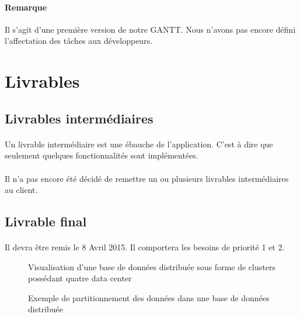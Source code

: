 \documentclass[12pt]{article}
\begin{document}
 \vspace{1cm}
 
\paragraph{Remarque} Il s'agit d'une première version de notre GANTT. Nous n'avons pas encore défini l'affectation des tâches aux développeurs.


\newpage

\section{Livrables}

\subsection{Livrables intermédiaires}

\paragraph{} Un livrable intermédiaire est une ébauche de l'application. C'est à dire que seulement quelques fonctionnalités sont implémentées.

\paragraph{} Il n'a pas encore été décidé de remettre un ou plusieurs livrables intermédiaires au client.

\subsection{Livrable final}

\paragraph{} Il devra être remis le 8 Avril 2015. Il comportera les besoins de priorité 1 et 2.



\begin{figure}[p]
	\centering
		
	\caption{Visualisation d'une base de données distribuée sous forme de clusters possédant quatre data center\label{fig:distributed_database}}
\end{figure}

\begin{figure}[p]
	\centering
		
	\caption{Exemple de partitionnement des données dans une base de données distribuée\label{fig:partitionning}}
\end{figure}
\end{document}

